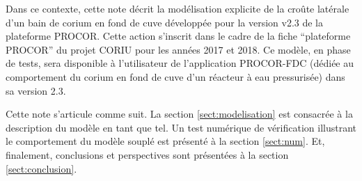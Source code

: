 Dans ce contexte, cette note décrit la modélisation explicite de la croûte latérale d'un bain de corium en fond de cuve développée pour la version v2.3 de la plateforme PROCOR. Cette action s'inscrit dans le cadre de la fiche ``plateforme PROCOR'' du projet CORIU pour les années 2017 et 2018. Ce modèle, en phase de tests, sera disponible à l'utilisateur de l'application PROCOR-FDC (dédiée au comportement du corium en fond de cuve d'un réacteur à eau pressurisée) dans sa version 2.3.

Cette note s'articule comme suit. La section \ref{sect:modelisation} est consacrée à la description du modèle en tant que tel. Un test numérique de vérification illustrant le comportement du modèle souplé est présenté à la section \ref{sect:num}. Et, finalement, conclusions et perspectives sont présentées à la section \ref{sect:conclusion}.